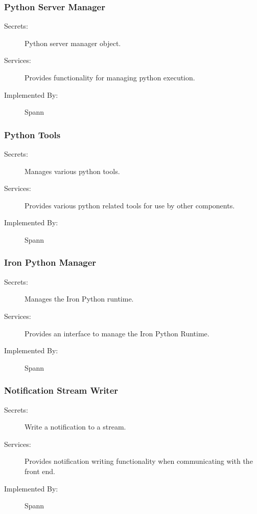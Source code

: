 \documentclass[12pt, titlepage]{article}
\begin{document}
\subsubsection{Python Server Manager} \label{mdPythonServerManager}

\begin{description}
\item[Secrets:] Python server manager object.
\item[Services:] Provides functionality for managing python execution.
\item[Implemented By:] Spann
\end{description}

\subsubsection{Python Tools} \label{mdPythonTools}

\begin{description}
\item[Secrets:] Manages various python tools.
\item[Services:] Provides various python related tools for use by other components.
\item[Implemented By:] Spann
\end{description}

\subsubsection{Iron Python Manager} \label{mdIronPythonManager}

\begin{description}
\item[Secrets:] Manages the Iron Python runtime.
\item[Services:] Provides an interface to manage the Iron Python Runtime.
\item[Implemented By:] Spann
\end{description}

\subsubsection{Notification Stream Writer} \label{mdNotificationStreamWriter}

\begin{description}
\item[Secrets:] Write a notification to a stream.
\item[Services:] Provides notification writing functionality when communicating
    with the front end.
\item[Implemented By:] Spann
\end{description}
\end{document}
